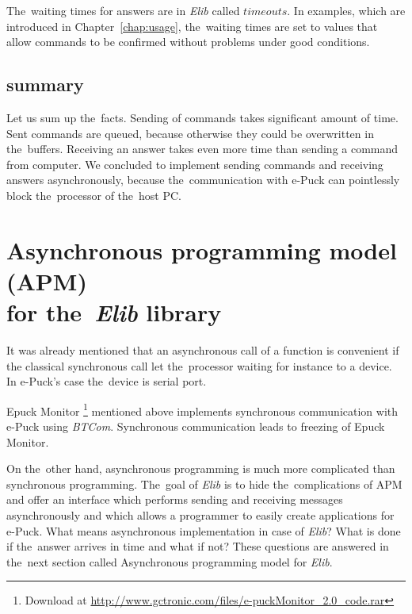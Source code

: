   \begin{definition}[Timeout]
  The~waiting times for answers are in {\it Elib} called $timeouts$.
  In examples, which are introduced in Chapter~\ref{chap:usage}, the~waiting times are set to values
  that allow commands to be confirmed without problems under good conditions.
  \end{definition}
  
  \subsection*{summary} %
  Let us sum up the~facts. Sending of commands takes significant amount of time.
  Sent commands are queued, because otherwise they could be overwritten in the~buffers.
  Receiving an answer takes even more time than sending a command from computer.
  We concluded to implement sending commands and receiving answers asynchronously, because the~communication with e-Puck
  can pointlessly block the~processor of the~host PC.

\section{Asynchronous programming model (APM)\\ for the~{\it Elib} library}
  \label{sec:apm}
  It was already mentioned that an asynchronous call of a function is convenient if the
  classical synchronous call let the~processor waiting for instance to a device.
  In e-Puck's case the~device is serial port. 
   
  Epuck Monitor \footnote{\small{Download at \url{http://www.gctronic.com/files/e-puckMonitor_2.0_code.rar}}}
  mentioned above implements synchronous communication with e-Puck using {\it BTCom}.
  Synchronous communication leads to freezing of Epuck Monitor. 

  On the~other hand, asynchronous programming is much more complicated than synchronous programming.
  The~goal of {\it Elib} is to hide the~complications of APM and offer an interface
  which performs sending and receiving messages asynchronously and
  which allows a programmer to easily create applications for e-Puck. 
  What means asynchronous implementation in case of {\it Elib}? What is done if the~answer arrives in time
  and what if not? These questions are answered in the~next section called Asynchronous programming model for {\it Elib}.

